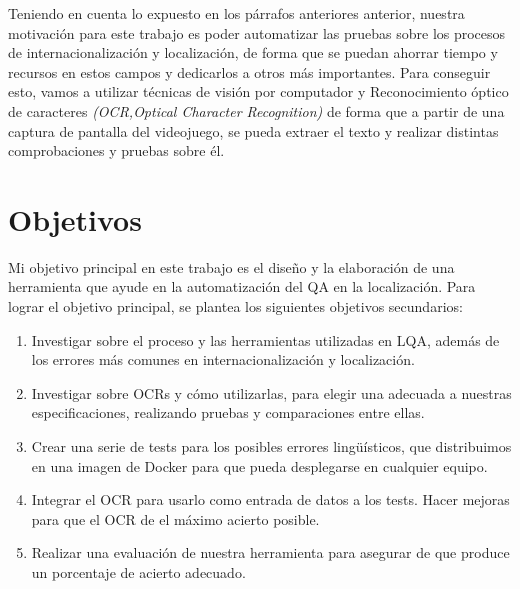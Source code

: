 Teniendo en cuenta lo expuesto en los párrafos anteriores anterior, nuestra motivación para este trabajo es poder automatizar las pruebas sobre los procesos de internacionalización y localización, de forma que se puedan
ahorrar tiempo y recursos en estos campos y dedicarlos a otros más importantes. Para conseguir esto, vamos a utilizar técnicas de visión por computador y Reconocimiento óptico de caracteres \textit{(OCR,Optical Character Recognition)}
de forma que a partir de una captura de pantalla del videojuego, se pueda extraer el texto y realizar distintas comprobaciones y pruebas sobre él.


\section{Objetivos}
Mi objetivo principal en este trabajo es el diseño y la elaboración de una herramienta que ayude en la automatización del QA en la localización.
Para lograr el objetivo principal, se plantea los siguientes objetivos secundarios: 
\begin{enumerate}

	\item Investigar sobre el proceso y las herramientas utilizadas en LQA, además de los errores más comunes en internacionalización y localización.
	\item Investigar sobre OCRs y cómo utilizarlas, para elegir una adecuada a nuestras especificaciones, realizando pruebas y comparaciones entre ellas.
	\item Crear una serie de tests para los posibles errores lingüísticos, que distribuimos en una imagen de Docker para que pueda desplegarse en cualquier equipo.
	\item Integrar el OCR para usarlo como entrada de datos a los tests. Hacer mejoras para que el OCR de el máximo acierto posible.
	\item Realizar una evaluación  de nuestra herramienta para asegurar de que produce un porcentaje de acierto adecuado.
\end{enumerate}
